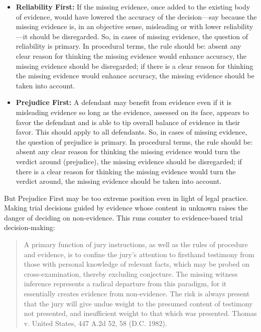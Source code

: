 \documentclass[
  10pt,
  dvipsnames,enabledeprecatedfontcommands]{scrartcl}
\begin{document}
\begin{itemize}

\item[] \textbf{Reliability First:} If the missing evidence, once added to the existing body of evidence, would have lowered the accuracy of the decision---say because the missing evidence is, in an objective sense, misleading or with lower reliability---it should be disregarded. So, in cases of missing evidence, the question of reliability is primary. In procedural terms, the rule should be: absent any clear reason for thinking the missing evidence would enhance accuracy, the missing evidence should be disregarded; if there is a clear reason for thinking the missing evidence would enhance accuracy, the missing evidence should be taken into account.

\item[] \textbf{Prejudice First:} A defendant may benefit from evidence even if it is misleading evidence so long as the evidence, assessed on its face, appears to favor the defendant and is able to tip overall balance of evidence in their favor. This should apply to all defendants. So, in cases of missing evidence, the question of prejudice is primary. In procedural terms, the rule should be: absent any clear reason for thinking the missing evidence would turn the verdict around (prejudice), the missing evidence should be disregarded; if there is a clear reason for thinking the missing evidence would turn the verdict around, the missing evidence should be taken into account.
\end{itemize}

\noindent But Prejudice First may be too extreme position even in light
of legal practice. Making trial decisions guided by evidence whose
content in unknown raises the danger of deciding on non-evidence. This
runs counter to evidence-based trial decision-making:

\begin{quote}
A primary function of jury instructions, as well as the rules of
procedure and evidence, is to confine the jury's attention to firsthand
testimony from those with personal knowledge of relevant facts, which
may be probed on cross-examination, thereby excluding conjecture. The
missing witness inference represents a radical departure from this
paradigm, for it essentially creates evidence from non-evidence. The
risk is always present that the jury will give undue weight to the
presumed content of testimony not presented, and insufficient weight to
that which was presented. Thomas v. United States, 447 A.2d 52, 58 (D.C.
1982).
\end{quote}
\end{document}
